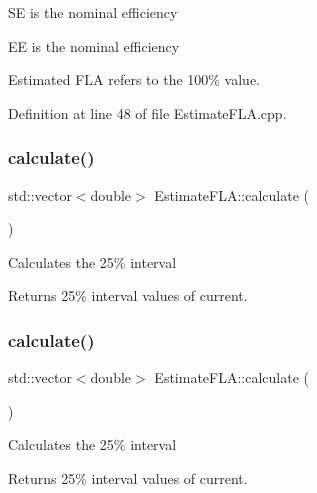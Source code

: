 SE is the nominal efficiency

EE is the nominal efficiency

Estimated F\+LA refers to the 100\% value. 

Definition at line 48 of file Estimate\+F\+L\+A.\+cpp.

\mbox{\label{class_estimate_f_l_a_aca54dc9982635255099529bbc36c2982}} 
\subsubsection{\texorpdfstring{calculate()}{calculate()}\hspace{0.1cm}{\footnotesize\ttfamily [2/3]}}
{\footnotesize\ttfamily std\+::vector$<$double$>$ Estimate\+F\+L\+A\+::calculate (\begin{DoxyParamCaption}{ }\end{DoxyParamCaption})}

Calculates the 25\% interval \begin{DoxyReturn}{Returns}
25\% interval values of current. 
\end{DoxyReturn}
\mbox{\label{class_estimate_f_l_a_aca54dc9982635255099529bbc36c2982}} 
\subsubsection{\texorpdfstring{calculate()}{calculate()}\hspace{0.1cm}{\footnotesize\ttfamily [3/3]}}
{\footnotesize\ttfamily std\+::vector$<$double$>$ Estimate\+F\+L\+A\+::calculate (\begin{DoxyParamCaption}{ }\end{DoxyParamCaption})}

Calculates the 25\% interval \begin{DoxyReturn}{Returns}
25\% interval values of current. 
\end{DoxyReturn}
\mbox{\label{class_estimate_f_l_a_a84bebf788da566929b85d3deb8fd9755}} 
